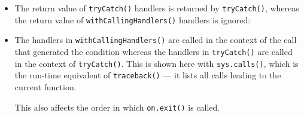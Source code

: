 \begin{itemize}
\item
  The return value of \texttt{tryCatch()} handlers is returned by
  \texttt{tryCatch()}, whereas the return value of
  \texttt{withCallingHandlers()} handlers is ignored:

\begin{Shaded}
\begin{Highlighting}[]
\StringTok{ }\NormalTok{(}\NormalTok{)}
\NormalTok{(}\NormalTok{(), } \NormalTok{)}
\NormalTok{(}\NormalTok{(), } \NormalTok{)}
\end{Highlighting}
\end{Shaded}
\item
  The handlers in \texttt{withCallingHandlers()} are called in the
  context of the call that generated the condition whereas the handlers
  in \texttt{tryCatch()} are called in the context of
  \texttt{tryCatch()}. This is shown here with \texttt{sys.calls()},
  which is the run-time equivalent of \texttt{traceback()} --- it lists
  all calls leading to the current function.

\begin{Shaded}
\begin{Highlighting}[]
\StringTok{ }\NormalTok{()}
\StringTok{ }\NormalTok{()}
\StringTok{ }\NormalTok{(}\NormalTok{)}

\NormalTok{(}\NormalTok{(), } \NormalTok{(}\NormalTok{()))}

\NormalTok{(}\NormalTok{(), } \NormalTok{(}\NormalTok{()))}
\end{Highlighting}
\end{Shaded}

  This also affects the order in which \texttt{on.exit()} is called.
\end{itemize}

